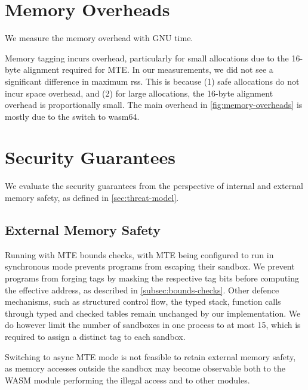 \section{Memory Overheads}\label{sec:memory-overheads}

We measure the memory overhead with GNU time.

Memory tagging incurs overhead, particularly for small allocations due to the 16-byte alignment required for MTE.
In our measurements, we did not see a significant difference in maximum \ac{rss}.
This is because (1) safe allocations do not incur space overhead, and (2) for large allocations, the 16-byte alignment overhead is proportionally small.
The main overhead in \cref{fig:memory-overheads} is mostly due to the switch to wasm64.

\begin{figure*}[ht]
    \centering
    
    \caption{PolyBench/C memory overheads of different configurations described in \cref{tab:benchmark-variants}, normalized to wasm64.}
    \label{fig:memory-overheads}
\end{figure*}

\section{Security Guarantees}\label{sec:security-guarantees}

We evaluate the security guarantees from the perspective of internal and external memory safety, as defined in \cref{sec:threat-model}.

\subsection{External Memory Safety}
\label{subsec:sec-guarantees-external-memory-safety}

Running with \ac{MTE} bounds checks, with \ac{MTE} being configured to run in synchronous mode prevents programs from escaping their sandbox.
We prevent programs from forging tags by masking the respective tag bits before computing the effective address, as described in \cref{subsec:bounds-checks}.
Other defence mechanisms, such as structured control flow, the typed stack, function calls through typed and checked tables remain unchanged by our implementation.
We do however limit the number of sandboxes in one process to at most 15, which is required to assign a distinct tag to each sandbox.

Switching to async \ac{MTE} mode is not feasible to retain external memory safety, as memory accesses outside the sandbox may become observable both to the \ac{WASM} module performing the illegal access and to other modules.

